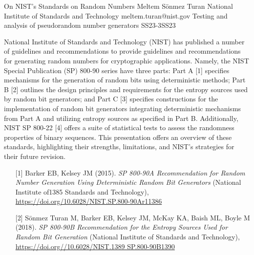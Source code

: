 \begin{talk}
  {On NIST's Standards on Random Numbers}%
  {Meltem S\"{o}nmez Turan}%
  {National Institute of Standards and Technology}%
  {meltem.turan@nist.gov}%
 {}%
{Testing and analysis of pseudorandom number generators}
{}{SS23-3}{SS23}

			
National Institute of Standards and Technology (NIST) has published a number of guidelines and recommendations to provide guidelines and recommendations for generating random numbers for cryptographic applications. Namely, the NIST Special Publication (SP) 800-90 series have three parts: Part A [1] specifies mechanisms for the generation of random bits using deterministic methods; Part B [2] outlines the design principles and requirements for the entropy sources used by random bit generators; and Part C [3] specifies constructions for the implementation of random bit generators integrating deterministic mechanisms from Part A and utilizing entropy sources as specified in Part B. Additionally, NIST SP 800-22 [4] offers a suite of statistical tests to assess the randomness properties of binary sequences. This presentation offers an overview of these standards, highlighting their strengths, limitations, and NIST's strategies for their future revision. 

\medskip

\begin{enumerate}
\item[{[1]}] Barker EB, Kelsey JM (2015). {\it SP 800-90A Recommendation for Random Number Generation Using Deterministic Random Bit Generators} (National Institute of1385
Standards and Technology), \url{https://doi.org/10.6028/NIST.SP.800-90Ar11386}

\item[{[2]}] S\"{o}nmez Turan M, Barker EB, Kelsey JM, McKay KA, Baish ML, Boyle M (2018). {\it SP 800-90B Recommendation for the Entropy Sources Used for Random Bit Generation} (National Institute of Standards and Technology), \url{https://doi.org//10.6028/NIST.1389
SP.800-90B1390}


\end{enumerate}
\end{talk}
